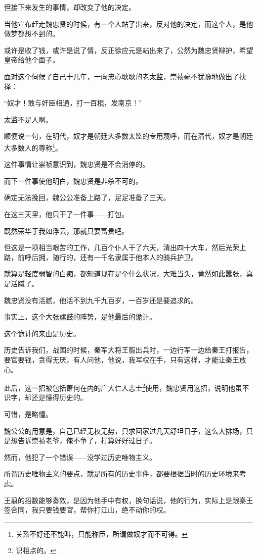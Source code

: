 \begin{multicols}{\theparacolNo}
但接下来发生的事情，却改变了他的决定。

当他宣布赶走魏忠贤的时候，有一个人站了出来，反对他的决定，而这个人，是他做梦都想不到的。

或许是收了钱，或许是说了情，反正徐应元是站出来了，公然为魏忠贤辩护，希望皇帝给他个面子。

面对这个伺候了自己十几年，一向忠心耿耿的老太监，崇祯毫不犹豫地做出了抉择：

“奴才！敢与奸臣相通，打一百棍，发南京！”

太监不是人啊。

顺便说一句，在明代，奴才是朝廷大多数太监的专用蔑呼，而在清代，奴才是朝廷大多数人的尊称\footnote{关系不好还不能叫，只能称臣，所谓做奴才而不可得。}。

这件事情让崇祯意识到，魏忠贤是不会消停的。

而下一件事使他明白，魏忠贤是非杀不可的。

确定无法挽回，魏公公准备上路了，足足准备了三天。

在这三天里，他只干了一件事——打包。

既然荣华于我如浮云，那就只要富贵吧。

但这是一项相当艰苦的工作，几百个仆人干了六天，清出四十大车，然后光荣上路，前呼后拥，随行的，还有一千名隶属于他本人的骑兵护卫。

就算是轻度弱智的白痴，都知道现在是个什么状况，大难当头，竟然如此嚣张，真是活腻了。

魏忠贤没有活腻，他活不到九千九百岁，一百岁还是要追求的。

事实上，这个大张旗鼓的阵势，是他最后的诡计。

这个诡计的来由是历史。

历史告诉我们，战国的时候，秦军大将王翦出兵时，一边行军一边给秦王打报告，要官要钱，贪得无厌，有人问他，他说，我军权在手，只有这样，才能让秦王放心。

此后，这一招被包括萧何在内的广大仁人志士\footnote{识相点的。}使用，魏忠贤用这招，说明他虽不识字，却还是懂得历史的。

可惜，是略懂。

魏公公的用意是，自己已经无权无势，只求回家过几天舒坦日子，这么大排场，只是想告诉崇祯老爷，俺不争了，打算好好过日子。

然而，他犯了一个错误——没学过历史唯物主义。

所谓历史唯物主义的要点，就是所有的历史事件，都要根据当时的历史环境来考虑。

王翦的招数能够奏效，是因为他手中有权，换句话说，他的行为，实际上是跟秦王签合同，我只要钱要官，帮你打江山，绝不动你的权。


\end{multicols}
